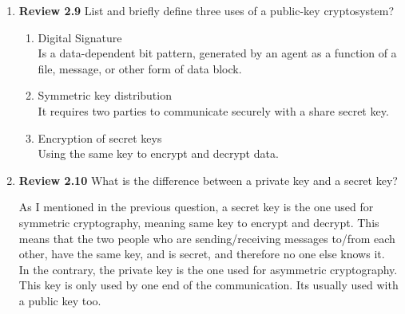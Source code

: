 \documentclass[12pt]{article}
\begin{document}
\begin{enumerate}
	\vspace{10pt}
	
	\item {\textbf{Review 2.9} List and briefly define three uses of a public-key cryptosystem? } 
	\begin{enumerate}
		\item Digital Signature\\
		Is a data-dependent bit pattern, generated by an agent as a function of a file, message, or other form of data block.
		\item Symmetric key distribution \\
		It requires two parties to communicate securely with a share secret key.
		\item Encryption of secret keys \\
		Using the same key to encrypt and decrypt data. 
	\end{enumerate}

		
	\vspace{10pt}
	
	\item {\textbf{Review 2.10} What is the difference between a private key and a secret key?}
	
	As I mentioned in the previous question, a secret key is the one used for symmetric cryptography, meaning same key to encrypt and decrypt. This means that the two people who are sending/receiving messages to/from each other, have the same key, and is secret, and therefore no one else knows it. \\
	In the contrary, the private key is the one used for asymmetric cryptography. This key is only used by one end of the communication. Its usually used with a public key too. 

	\vspace{10pt}



\end{enumerate}
\end{document}
